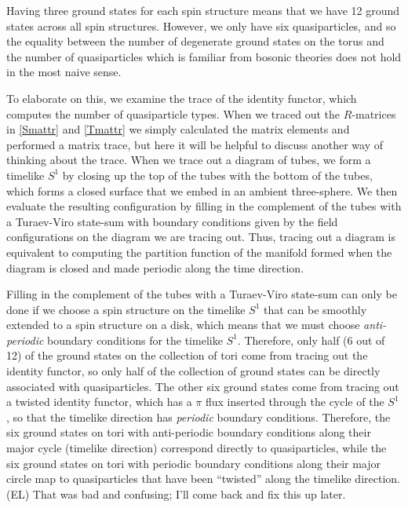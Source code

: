 \documentclass[12pt,a4paper]{article}
\newcommand{\dave}[1]{{\color{ao(english)}\footnotesize{(DA) #1}}}
\newcommand{\ethan}[1]{{\color{amethyst}\footnotesize{(EL) #1}}}
\begin{document}

Having three ground states for each spin structure means that we have 12 ground states across all spin structures. However, we only have six quasiparticles, and so the equality between the number of degenerate ground states on the torus and the number of quasiparticles which is familiar from bosonic theories does not hold in the most naive sense. 

To elaborate on this, we examine the trace of the identity functor, which computes the number of quasiparticle types. When we traced out the $R$-matrices in \eqref{Smattr} and \eqref{Tmattr} we simply calculated the matrix elements and performed a matrix trace, but here it will be helpful to discuss another way of thinking about the trace. When we trace out a diagram of tubes, we form a timelike $S^1$ by closing up the top of the tubes with the bottom of the tubes, which forms a closed surface that we embed in an ambient three-sphere. We then evaluate the resulting configuration by filling in the complement of the tubes with a Turaev-Viro state-sum with boundary conditions given by the field configurations on the diagram we are tracing out. Thus, tracing out a diagram is equivalent to computing the partition function of the manifold formed when the diagram is closed and made periodic along the time direction. 

Filling in the complement of the tubes with a Turaev-Viro state-sum can only be done if we choose a spin structure on the timelike $S^1$ that can be smoothly extended to a spin structure on a disk, which means that we must choose {\it anti-periodic} boundary conditions for the timelike $S^1$. Therefore, only half ($6$ out of 12) of the ground states on the collection of tori come from tracing out the identity functor, so only half of the collection of ground states can be directly associated with quasiparticles. The other six ground states come from tracing out a twisted identity functor, which has a $\pi$ flux inserted through the cycle of the $S^1$, so that the timelike direction has {\it periodic} boundary conditions. Therefore, the six ground states on tori with anti-periodic boundary conditions along their major cycle (timelike direction) correspond directly to quasiparticles, while the six ground states on tori with periodic boundary conditions along their major circle map to quasiparticles that have been ``twisted'' along the timelike direction. \ethan{That was bad and confusing; I'll come back and fix this up later.}
\end{document}
